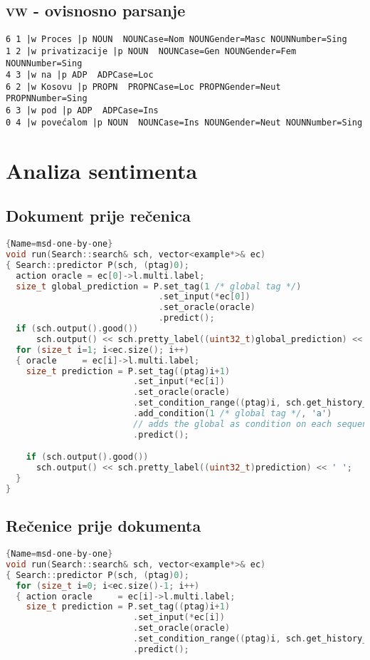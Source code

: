 \begin{appendix}
\section{\textsc{vw} - ovisnosno parsanje}
\begin{lstlisting}[basicstyle=\tiny\ttfamily]
6 1 |w Proces |p NOUN  NOUNCase=Nom NOUNGender=Masc NOUNNumber=Sing
1 2 |w privatizacije |p NOUN  NOUNCase=Gen NOUNGender=Fem NOUNNumber=Sing
4 3 |w na |p ADP  ADPCase=Loc
6 2 |w Kosovu |p PROPN  PROPNCase=Loc PROPNGender=Neut PROPNNumber=Sing
6 3 |w pod |p ADP  ADPCase=Ins
0 4 |w povećalom |p NOUN  NOUNCase=Ins NOUNGender=Neut NOUNNumber=Sing
\end{lstlisting}

\chapter{Analiza sentimenta}\label{appendix:sentiment}
\section{Dokument prije rečenica}
\begin{lstlisting}[language=C++,
                   basicstyle=\scriptsize\ttfamily]{Name=msd-one-by-one}
void run(Search::search& sch, vector<example*>& ec)
{ Search::predictor P(sch, (ptag)0);
  action oracle = ec[0]->l.multi.label;
  size_t global_prediction = P.set_tag(1 /* global tag */)
                              .set_input(*ec[0])
                              .set_oracle(oracle)
                              .predict();
  if (sch.output().good())
      sch.output() << sch.pretty_label((uint32_t)global_prediction) << ' ';
  for (size_t i=1; i<ec.size(); i++)
  { oracle     = ec[i]->l.multi.label;
    size_t prediction = P.set_tag((ptag)i+1)
                         .set_input(*ec[i])
                         .set_oracle(oracle)
                         .set_condition_range((ptag)i, sch.get_history_length(), 'p')
                         .add_condition(1 /* global tag */, 'a')
                         // adds the global as condition on each sequence element
                         .predict();

    if (sch.output().good())
      sch.output() << sch.pretty_label((uint32_t)prediction) << ' ';
  }
}
\end{lstlisting}
\newpage
\section{Rečenice prije dokumenta}
\begin{lstlisting}[language=C++,
                   basicstyle=\scriptsize\ttfamily]{Name=msd-one-by-one}
void run(Search::search& sch, vector<example*>& ec)
{ Search::predictor P(sch, (ptag)0);
  for (size_t i=0; i<ec.size()-1; i++)
  { action oracle     = ec[i]->l.multi.label;
    size_t prediction = P.set_tag((ptag)i+1)
                         .set_input(*ec[i])
                         .set_oracle(oracle)
                         .set_condition_range((ptag)i, sch.get_history_length(), 'p')
                         .predict();


\end{lstlisting}
\end{appendix}
